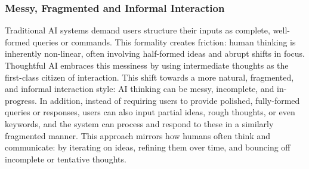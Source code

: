 \subsubsection{Messy, Fragmented and Informal Interaction}
Traditional AI systems demand users structure their inputs as complete, well-formed queries or commands. This formality creates friction: human thinking is inherently non-linear, often involving half-formed ideas and abrupt shifts in focus. 
Thoughtful AI embraces this messiness by using intermediate thoughts as the first-class citizen of interaction. 
This shift towards a more natural, fragmented, and informal interaction style: AI thinking can be messy, incomplete, and in-progress. 
In addition, instead of requiring users to provide polished, fully-formed queries or responses, users can also input partial ideas, rough thoughts, or even keywords, and the system can process and respond to these in a similarly fragmented manner. 
This approach mirrors how humans often think and communicate: by iterating on ideas, refining them over time, and bouncing off incomplete or tentative thoughts. 
